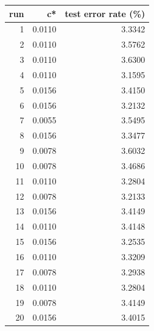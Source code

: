 \begin{tabular}{rrr}
\toprule
run & c* & test error rate (\%) \\
\midrule
1 & 0.0110 & 3.3342 \\
2 & 0.0110 & 3.5762 \\
3 & 0.0110 & 3.6300 \\
4 & 0.0110 & 3.1595 \\
5 & 0.0156 & 3.4150 \\
6 & 0.0156 & 3.2132 \\
7 & 0.0055 & 3.5495 \\
8 & 0.0156 & 3.3477 \\
9 & 0.0078 & 3.6032 \\
10 & 0.0078 & 3.4686 \\
11 & 0.0110 & 3.2804 \\
12 & 0.0078 & 3.2133 \\
13 & 0.0156 & 3.4149 \\
14 & 0.0110 & 3.4148 \\
15 & 0.0156 & 3.2535 \\
16 & 0.0110 & 3.3209 \\
17 & 0.0078 & 3.2938 \\
18 & 0.0110 & 3.2804 \\
19 & 0.0078 & 3.4149 \\
20 & 0.0156 & 3.4015 \\
\bottomrule
\end{tabular}

